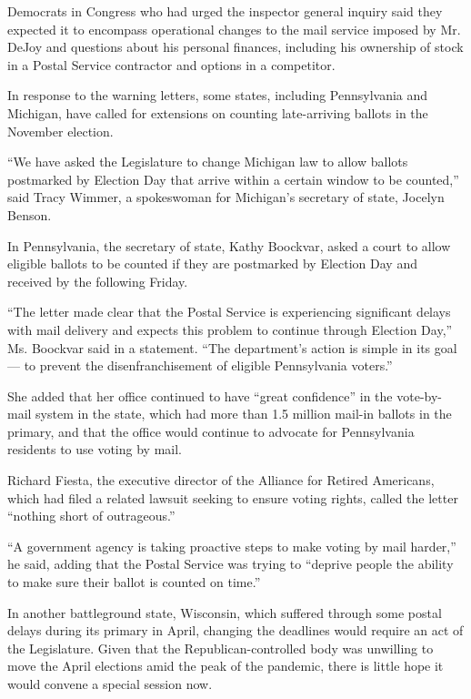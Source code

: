 Democrats in Congress who had urged the inspector general inquiry said
they expected it to encompass operational changes to the mail service
imposed by Mr. DeJoy and questions about his personal finances,
including his ownership of stock in a Postal Service contractor and
options in a competitor.

In response to the warning letters, some states, including Pennsylvania
and Michigan, have called for extensions on counting late-arriving
ballots in the November election.

``We have asked the Legislature to change Michigan law to allow ballots
postmarked by Election Day that arrive within a certain window to be
counted,'' said Tracy Wimmer, a spokeswoman for Michigan's secretary of
state, Jocelyn Benson.

In Pennsylvania, the secretary of state, Kathy Boockvar, asked a court
to allow eligible ballots to be counted if they are postmarked by
Election Day and received by the following Friday.

``The letter made clear that the Postal Service is experiencing
significant delays with mail delivery and expects this problem to
continue through Election Day,'' Ms. Boockvar said in a statement. ``The
department's action is simple in its goal --- to prevent the
disenfranchisement of eligible Pennsylvania voters.''

She added that her office continued to have ``great confidence'' in the
vote-by-mail system in the state, which had more than 1.5 million
mail-in ballots in the primary, and that the office would continue to
advocate for Pennsylvania residents to use voting by mail.

Richard Fiesta, the executive director of the Alliance for Retired
Americans, which had filed a related lawsuit seeking to ensure voting
rights, called the letter ``nothing short of outrageous.''

``A government agency is taking proactive steps to make voting by mail
harder,'' he said, adding that the Postal Service was trying to
``deprive people the ability to make sure their ballot is counted on
time.''

In another battleground state, Wisconsin, which suffered through some
postal delays during its primary in April, changing the deadlines would
require an act of the Legislature. Given that the Republican-controlled
body was unwilling to move the April elections amid the peak of the
pandemic, there is little hope it would convene a special session now.

